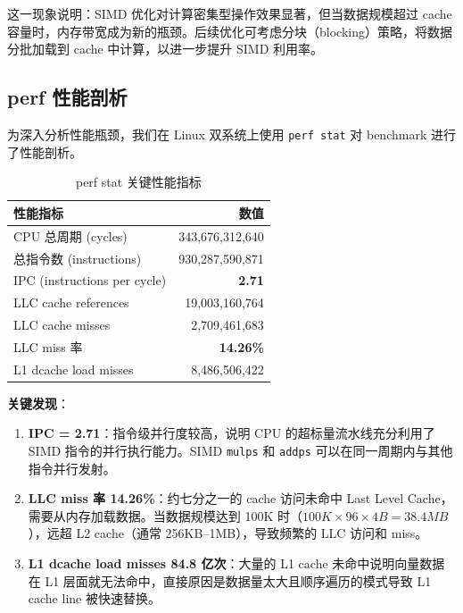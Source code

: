 \documentclass[a4paper]{article}
\begin{document}
这一现象说明：SIMD 优化对计算密集型操作效果显著，但当数据规模超过 cache 容量时，内存带宽成为新的瓶颈。后续优化可考虑分块（blocking）策略，将数据分批加载到 cache 中计算，以进一步提升 SIMD 利用率。

\subsection{perf 性能剖析}

为深入分析性能瓶颈，我们在 Linux 双系统上使用 \texttt{perf stat} 对 benchmark 进行了性能剖析。

\begin{table}[!htbp]
  \centering
  \begin{tabular}{lr}
  \toprule
  性能指标 & 数值 \\
  \midrule
  CPU 总周期 (cycles) & 343,676,312,640 \\
  总指令数 (instructions) & 930,287,590,871 \\
  IPC (instructions per cycle) & \textbf{2.71} \\
  LLC cache references & 19,003,160,764 \\
  LLC cache misses & 2,709,461,683 \\
  LLC miss 率 & \textbf{14.26\%} \\
  L1 dcache load misses & 8,486,506,422 \\
  \bottomrule
  \end{tabular}
  \caption{perf stat 关键性能指标}
\end{table}

\textbf{关键发现}：

\begin{enumerate}
  \item \textbf{IPC = 2.71}：指令级并行度较高，说明 CPU 的超标量流水线充分利用了 SIMD 指令的并行执行能力。SIMD \texttt{mulps} 和 \texttt{addps} 可以在同一周期内与其他指令并行发射。

  \item \textbf{LLC miss 率 14.26\%}：约七分之一的 cache 访问未命中 Last Level Cache，需要从内存加载数据。当数据规模达到 100K 时（$100K \times 96 \times 4B = 38.4MB$），远超 L2 cache（通常 256KB--1MB），导致频繁的 LLC 访问和 miss。

  \item \textbf{L1 dcache load misses 84.8 亿次}：大量的 L1 cache 未命中说明向量数据在 L1 层面就无法命中，直接原因是数据量太大且顺序遍历的模式导致 L1 cache line 被快速替换。
\end{enumerate}
\end{document}
